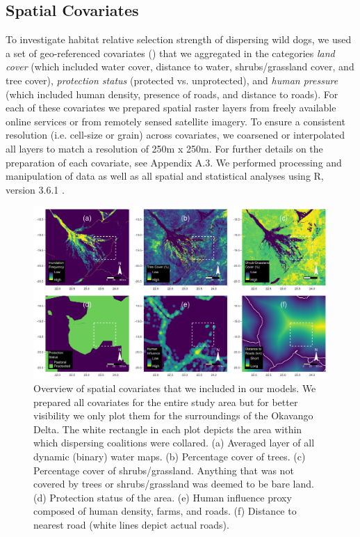 \documentclass[abstract=on,10pt,a4paper,bibliography=totocnumbered]{article}
\begin{document}
\subsection{Spatial Covariates}
To investigate habitat relative selection strength of
dispersing wild dogs, we used a set of geo-referenced covariates
() that we aggregated in the categories \textit{land cover}
(which included water cover, distance to water, shrubs/grassland cover, and tree
cover), \textit{protection status} (protected vs. unprotected), and
\textit{human pressure} (which included human density, presence of roads, and
distance to roads). For each of these covariates we prepared spatial raster
layers from freely available online services or from remotely sensed satellite
imagery. To ensure a consistent resolution (i.e. cell-size or grain) across
covariates, we coarsened or interpolated all layers to match a resolution of
250m x 250m. For further details on the preparation of each covariate, see
Appendix A.3. We performed processing and manipulation of data as well as all
spatial and statistical analyses using R, version 3.6.1 \citep{R.2019}.

\begin{figure}[h]
  \begin{center}
    \includegraphics[width = \textwidth]{99_Covariates.pdf}
    \caption{Overview of spatial covariates that we included in our models. We
    prepared all covariates for the entire study area but for better visibility
    we only plot them for the surroundings of the Okavango Delta. The white
    rectangle in each plot depicts the area within which dispersing coalitions
    were collared. (a) Averaged layer of all dynamic (binary) water maps. (b)
    Percentage cover of trees. (c) Percentage cover of shrubs/grassland.
    Anything that was not covered by trees or shrubs/grassland was deemed to be
    bare land. (d) Protection status of the area. (e) Human influence proxy
    composed of human density, farms, and roads. (f) Distance to nearest road
    (white lines depict actual roads).}
    \label{Covariates}
  \end{center}
\end{figure}
\end{document}
